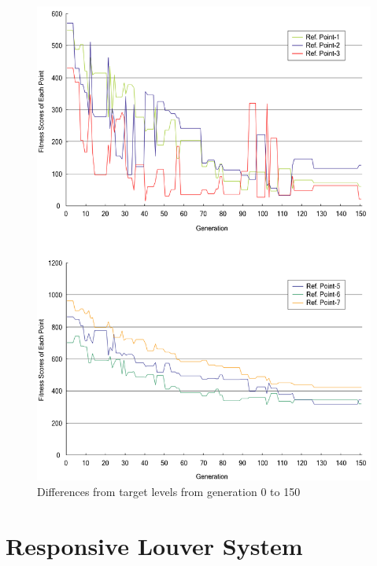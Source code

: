 \begin{figure}[h]
\centering
\includegraphics[width=\textwidth]{./Images/30-RFDSdiff}
\caption[RFDS Target Level Differences]{Differences from target levels from generation 0 to 150 \cite{kawakita01}}
\label{fig:RFDSdiff}
\end{figure}


\clearpage
\section{Responsive Louver System}


